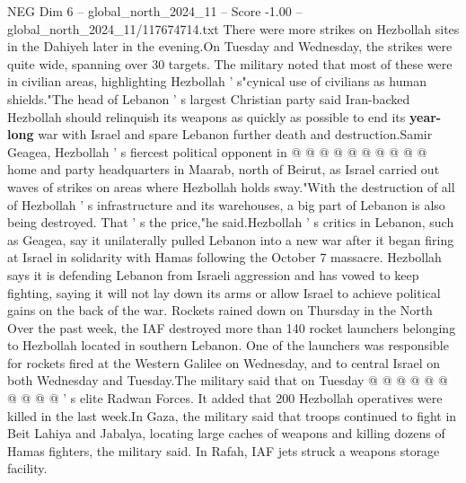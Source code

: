 \begin{textsample}{NEG Dim 6 – global\_north\_2024\_11 – Score -1.00 – global\_north\_2024\_11/117674714.txt}
There were more strikes on Hezbollah sites in the Dahiyeh later in the evening.On Tuesday and Wednesday, the strikes were quite wide, spanning over 30 targets.
The military noted that most of these were in civilian areas, highlighting Hezbollah ' s"cynical use of civilians as human shields."The head of Lebanon ' s largest Christian party said Iran-backed Hezbollah should relinquish its weapons as quickly as possible to end its \textbf{year-long} war with Israel and spare Lebanon further death and destruction.Samir Geagea, Hezbollah ' s fiercest political opponent in @ @ @ @ @ @ @ @ @ @ home and party headquarters in Maarab, north of Beirut, as Israel carried out waves of strikes on areas where Hezbollah holds sway."With the destruction of all of Hezbollah ' s infrastructure and its warehouses, a big part of Lebanon is also being destroyed.
That ' s the price,"he said.Hezbollah ' s critics in Lebanon, such as Geagea, say it unilaterally pulled Lebanon into a new war after it began firing at Israel in solidarity with Hamas following the October 7 massacre.
Hezbollah says it is defending Lebanon from Israeli aggression and has vowed to keep fighting, saying it will not lay down its arms or allow Israel to achieve political gains on the back of the war.
Rockets rained down on Thursday in the North Over the past week, the IAF destroyed more than 140 rocket launchers belonging to Hezbollah located in southern Lebanon.
One of the launchers was responsible for rockets fired at the Western Galilee on Wednesday, and to central Israel on both Wednesday and Tuesday.The military said that on Tuesday @ @ @ @ @ @ @ @ @ @ ' s elite Radwan Forces.
It added that 200 Hezbollah operatives were killed in the last week.In Gaza, the military said that troops continued to fight in Beit Lahiya and Jabalya, locating large caches of weapons and killing dozens of Hamas fighters, the military said.
In Rafah, IAF jets struck a weapons storage facility.

\end{textsample}
